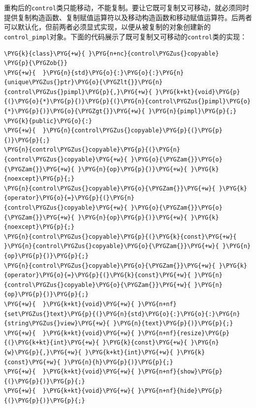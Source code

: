 
重构后的\texttt{control}类只能移动，不能复制。要让它既可复制又可移动，就必须同时提供复制构造函数、复制赋值运算符以及移动构造函数和移动赋值运算符。后两者可以默认化，但前两者必须显式实现，以便从被复制的对象创建新的\texttt{control\_\allowbreak{}pimpl}对象。下面的代码展示了既可复制又可移动的\texttt{control}类的实现：



\begin{codeblockbg}
\begin{Verbatim}[commandchars=\\\{\},breaklines=true,breakanywhere=true,fontsize=\codefont,xleftmargin=17bp]
\PYG{k}{class}\PYG{+w}{ }\PYG{n+nc}{control\PYGZus{}copyable}
\PYG{p}{\PYGZob{}}
\PYG{+w}{  }\PYG{n}{std}\PYG{o}{:}\PYG{o}{:}\PYG{n}{unique\PYGZus{}ptr}\PYG{o}{\PYGZlt{}}\PYG{n}{control\PYGZus{}pimpl}\PYG{p}{,}\PYG{+w}{ }\PYG{k+kt}{void}\PYG{p}{(}\PYG{o}{*}\PYG{p}{)}\PYG{p}{(}\PYG{n}{control\PYGZus{}pimpl}\PYG{o}{*}\PYG{p}{)}\PYG{o}{\PYGZgt{}}\PYG{+w}{ }\PYG{n}{pimpl}\PYG{p}{;}
\PYG{k}{public}\PYG{o}{:}
\PYG{+w}{  }\PYG{n}{control\PYGZus{}copyable}\PYG{p}{(}\PYG{p}{)}\PYG{p}{;}
\PYG{n}{control\PYGZus{}copyable}\PYG{p}{(}\PYG{n}{control\PYGZus{}copyable}\PYG{+w}{ }\PYG{o}{\PYGZam{}}\PYG{o}{\PYGZam{}}\PYG{+w}{ }\PYG{n}{op}\PYG{p}{)}\PYG{+w}{ }\PYG{k}{noexcept}\PYG{p}{;}
\PYG{n}{control\PYGZus{}copyable}\PYG{o}{\PYGZam{}}\PYG{+w}{ }\PYG{k}{operator}\PYG{o}{=}\PYG{p}{(}\PYG{n}{control\PYGZus{}copyable}\PYG{+w}{ }\PYG{o}{\PYGZam{}}\PYG{o}{\PYGZam{}}\PYG{+w}{ }\PYG{n}{op}\PYG{p}{)}\PYG{+w}{ }\PYG{k}{noexcept}\PYG{p}{;}
\PYG{n}{control\PYGZus{}copyable}\PYG{p}{(}\PYG{k}{const}\PYG{+w}{ }\PYG{n}{control\PYGZus{}copyable}\PYG{o}{\PYGZam{}}\PYG{+w}{ }\PYG{n}{op}\PYG{p}{)}\PYG{p}{;}
\PYG{n}{control\PYGZus{}copyable}\PYG{o}{\PYGZam{}}\PYG{+w}{ }\PYG{k}{operator}\PYG{o}{=}\PYG{p}{(}\PYG{k}{const}\PYG{+w}{ }\PYG{n}{control\PYGZus{}copyable}\PYG{o}{\PYGZam{}}\PYG{+w}{ }\PYG{n}{op}\PYG{p}{)}\PYG{p}{;}
\PYG{+w}{  }\PYG{k+kt}{void}\PYG{+w}{ }\PYG{n+nf}{set\PYGZus{}text}\PYG{p}{(}\PYG{n}{std}\PYG{o}{:}\PYG{o}{:}\PYG{n}{string\PYGZus{}view}\PYG{+w}{ }\PYG{n}{text}\PYG{p}{)}\PYG{p}{;}
\PYG{+w}{  }\PYG{k+kt}{void}\PYG{+w}{ }\PYG{n+nf}{resize}\PYG{p}{(}\PYG{k+kt}{int}\PYG{+w}{ }\PYG{k}{const}\PYG{+w}{ }\PYG{n}{w}\PYG{p}{,}\PYG{+w}{ }\PYG{k+kt}{int}\PYG{+w}{ }\PYG{k}{const}\PYG{+w}{ }\PYG{n}{h}\PYG{p}{)}\PYG{p}{;}
\PYG{+w}{  }\PYG{k+kt}{void}\PYG{+w}{ }\PYG{n+nf}{show}\PYG{p}{(}\PYG{p}{)}\PYG{p}{;}
\PYG{+w}{  }\PYG{k+kt}{void}\PYG{+w}{ }\PYG{n+nf}{hide}\PYG{p}{(}\PYG{p}{)}\PYG{p}{;}

\end{Verbatim}
\end{codeblockbg}
